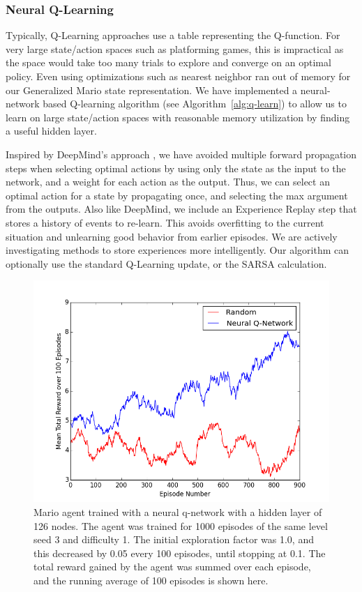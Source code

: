 \documentclass{article}
\begin{document}
\subsubsection{Neural Q-Learning}

Typically, Q-Learning approaches use a table representing the Q-function. For very large state/action spaces such as platforming games, this is impractical as the space would take too many trials to explore and converge on an optimal policy. Even using optimizations such as nearest neighbor ran out of memory for our Generalized Mario state representation. We have implemented a neural-network based Q-learning algorithm (see Algorithm~\ref{alg:q-learn}) to allow us to learn on large state/action spaces with reasonable memory utilization by finding a useful hidden layer. 

Inspired by DeepMind's approach \cite{Mnih13}, we have avoided multiple forward propagation steps when selecting optimal actions by using only the state as the input to the network, and a weight for each action as the output. Thus, we can select an optimal action for a state by propagating once, and selecting the max argument from the outputs. Also like DeepMind, we include an Experience Replay step that stores a history of events to re-learn. This avoids overfitting to the current situation and unlearning good behavior from earlier episodes. We are actively investigating methods to store experiences more intelligently. Our algorithm can optionally use the standard Q-Learning update, or the SARSA calculation.

 \begin{figure}
 \begin{center}
\includegraphics[scale=0.42]{progress_report.png}
\caption{Mario agent trained with a neural q-network with a hidden layer of 126 nodes. The agent was trained for 1000 episodes of the same level seed 3 and difficulty 1. The initial exploration factor was 1.0, and this decreased by 0.05 every 100 episodes, until stopping at 0.1. The total reward gained by the agent was summed over each episode, and the running average of 100 episodes is shown here.}
\end{center}
\end{figure}
\end{document}
